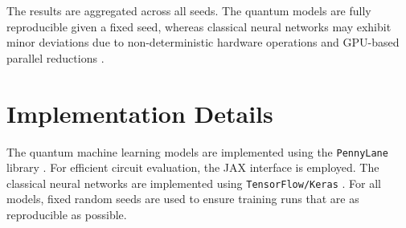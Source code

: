 The results are aggregated across all seeds.
The quantum models are fully reproducible given a fixed seed,
whereas classical neural networks may exhibit minor deviations
due to non-deterministic hardware operations and GPU-based
parallel reductions \cite{tensorflow_determinism}.

\section{Implementation Details}
\label{sec:mt-implementation-details}

The quantum machine learning models are implemented using the
\texttt{PennyLane} library \cite{bergholm2018pennylane}.
For efficient circuit evaluation, the JAX interface \cite{bradbury2018jax}
is employed.
The classical neural networks are implemented using
\texttt{TensorFlow/Keras} \cite{abadi2015tensorflow}.
For all models, fixed random seeds are used
to ensure training runs that are as reproducible as possible.